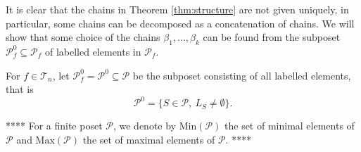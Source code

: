 \documentclass[12pt]{article}
\theoremstyle{definition}
\theoremstyle{remark}
\def\Te{\mathcal T}
\def\Pe{\mathcal P}
\begin{document}
%
%
%
%
%
%



It is clear that the chains in Theorem \ref{thm:structure} are not given uniquely, in
particular, some chains can be decomposed as a  concatenation of chains.
We will show that some choice of the chains $\beta_1,\dots,\beta_k$  can be found from the subposet
$\Pe_f^0\subseteq \Pe_f$ of labelled elements in $\Pe_f$.





For  $f\in \Te_n$, let $\Pe_f^0=\Pe^0\subseteq \Pe$ be the subposet consisting
of  all  labelled elements, that is
\[
\Pe^0=\{S\in \Pe, \ L_S\ne \emptyset \}.
\]




****
For a finite poset $\Pe$, we denote by $\mathrm{Min}(\Pe)$ the set of minimal elements of
$\Pe$ and $\mathrm{Max}(\Pe)$ the set of maximal elements of $\Pe$.
****
\end{document}
